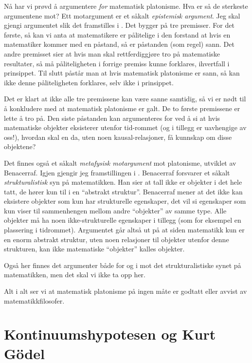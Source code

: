 \documentclass[12pt, norsk]{article}
\begin{document}
Nå har vi prøvd å argumentere \emph{for} matematisk platonisme. Hva er så de sterkeste argumentene mot? Ett motargument er et såkalt \emph{epistemisk argument}. Jeg skal gjengi argumentet slik det framstilles i \cite{linnebo_artikkel}. Det bygger på tre premisser. For det første, så kan vi anta at matematikere er pålitelige i den forstand at hvis en matematiker kommer med en påstand, så er påstanden (som regel) sann. Det andre premisset sier at hvis man skal rettferdiggjøre tro på matematiske resultater, så må påliteligheten i forrige premiss kunne forklares, ihvertfall i prinsippet. Til slutt påstår man at hvis matematisk platonisme er sann, så kan ikke denne påliteligheten forklares, selv ikke i prinsippet. 

Det er klart at ikke alle tre premissene kan være sanne samtidig, så vi er nødt til å konkludere med at matematisk platonisme er galt. De to første premissene er lette å tro på. Den siste påstanden kan argumenteres for ved å si at hvis matematiske objekter eksisterer utenfor tid-rommet (og i tillegg er uavhengige av oss!), hvordan skal en da, uten noen kausal-relasjoner, få kunnskap om disse objektene?

Det finnes også et såkalt \emph{metafysisk motargument} mot platonisme, utviklet av Benacerraf. Igjen gjengir jeg framstillingen i \cite{linnebo_artikkel}. Benacerraf forsvarer et såkalt \emph{strukturalistisk} syn på matematikken. Han sier at tall ikke er objekter i det hele tatt, de hører kun til i en ``abstrakt struktur''. Benacerraf mener at det ikke kan eksistere objekter som kun har strukturelle egenskaper, det vil si egenskaper som kun viser til sammenhengen mellom andre ``objekter'' av samme type. Alle objekter må ha noen ikke-strukturelle egenskaper i tillegg (som for eksempel en plassering i tidrommet). Argumentet går altså ut på at siden matematikk kun er en enorm abstrakt struktur, uten noen relasjoner til objekter utenfor denne strukturen, kan ikke matematiske ``objekter'' kalles objekter.

Også her finnes det argumenter både for og i mot det strukturalistiske synet på matematikken, men det skal vi ikke ta opp her. \linebreak 

Alt i alt ser vi at matematisk platonisme på ingen måte er godtatt eller avvist av matematikkfilosofer. 
 
\section{Kontinuumshypotesen og Kurt Gödel}
\end{document}
